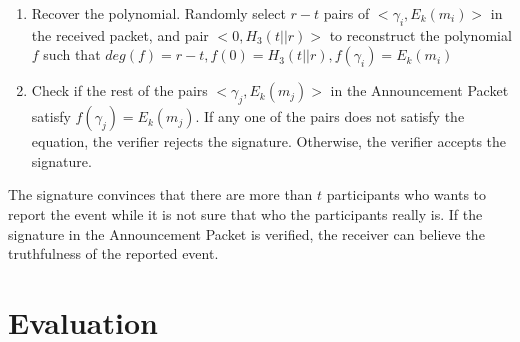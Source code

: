 \documentclass[a4paper]{article}
\begin{document}
\begin{enumerate}
\begin{enumerate}
        \item Recover the polynomial. Randomly select $r-t$ pairs of $<\gamma_i, E_k(m_i)>$ in the received packet, and pair $<0, H_3(t||r)>$ to reconstruct the polynomial $f$ such that $deg(f) = r - t, f(0) = H_3(t||r), f(\gamma_i) = E_k(m_i)$
        \item Check if the rest of the pairs $<\gamma_j, E_k(m_j)>$ in the Announcement Packet satisfy $f(\gamma_j)=E_k(m_j)$. If any one of the pairs does not satisfy the equation, the verifier rejects the signature. Otherwise, the verifier accepts the signature.
        \end{enumerate}
        The signature convinces that there are more than $t$ participants who wants to report the event while it is not sure that who the participants really is. If the signature in the Announcement Packet is verified, the receiver can believe the truthfulness of the reported event.
\end{enumerate}
\section{Evaluation}
\end{document}
